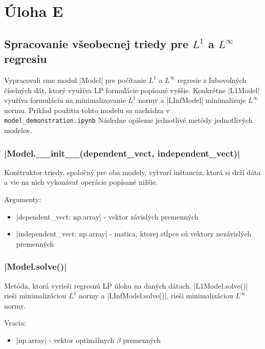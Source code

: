 \documentclass[report.tex]{subfiles}
\begin{document}
\section{Úloha E}	

\subsection{Spracovanie všeobecnej triedy pre $L^1$ a $L^{\infty}$ regresiu}

Vypracovali sme modul \pyth|Model| pre počítanie $L^1$ a $L^{\infty}$ regresie z ľubovoľných číselných dát, ktorý využíva LP formulácie popísané vyššie. Konkrétne \pyth|L1Model| využíva formuláciu na minimalizovanie $L^1$ normy a \pyth|LInfModel| minimalizuje $L^{\infty}$ normu. Príklad použitia tohto modelu sa nachádza v \verb|model_demonstration.ipynb| Následne opíšeme jednotlivé metódy jednotlivých modelov.

\subsubsection*{\pyth|Model.__init__(dependent_vect, independent_vect)|}

Konštruktor triedy, spoločný pre oba modely, vytvorí inštanciu, ktorá si drží dáta a vie na nich vykonávať operácie popísané nižšie. 

Argumenty:

\begin{itemize}
	\item \pyth|dependent_vect: np.array| - vektor závislých premenných
	\item \pyth|independent_vect: np.array| - matica, ktorej stĺpce sú vektory nezávislých premenných
\end{itemize}

\subsubsection*{\pyth|Model.solve()|}

Metóda, ktorá vyrieši regresnú LP úlohu na daných dátach. \pyth|L1Model.solve()| rieši minimalizáciou $L^1$ normy a \pyth|LInfModel.solve()|, rieši minimalizáciou $L^{\infty}$ normy. 

Vracia:

\begin{itemize}
	\item \pyth|np.array| - vektor optimálnych $\beta$ premenných
\end{itemize}
\end{document}
